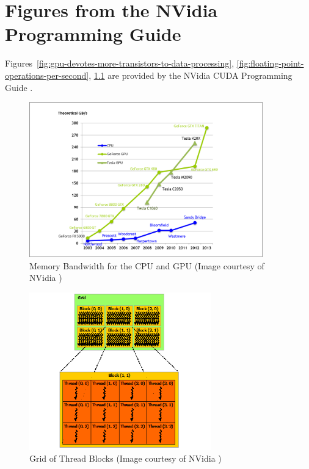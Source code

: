 \chapter{Figures from the NVidia Programming Guide}

Figures~\ref{fig:gpu-devotes-more-transistors-to-data-processing}, \ref{fig:floating-point-operations-per-second}, \ref{fig:memory-bandwidth} are provided by the NVidia CUDA Programming Guide \cite{CudaGuide2013}. 


\begin{figure}
\centering
\includegraphics[width=0.9\textwidth]{gpu_content/nvidia_figures/memory-bandwidth.png}
\caption{Memory Bandwidth for the CPU and GPU (Image courtesy of NVidia \cite{CudaGuide2013})} 
\label{fig:memory-bandwidth}
\end{figure}

\begin{figure}
\centering
\includegraphics[width=0.7\textwidth]{gpu_content/nvidia_figures/grid-of-thread-blocks.png}
\caption{Grid of Thread Blocks (Image courtesy of NVidia \cite{CudaGuide2013})} 
\label{fig:grid-of-thread-blocks}
\end{figure}
